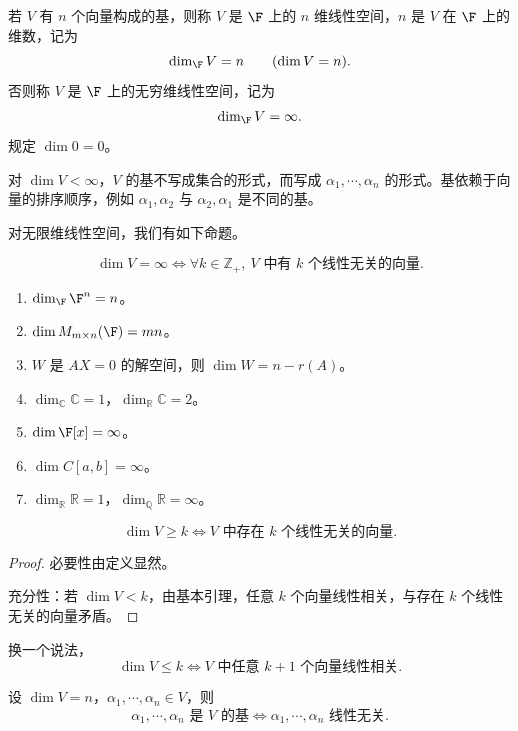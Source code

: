 \begin{definition}
	若 $V$ 有 $n$ 个向量构成的基，则称 $V$ 是 $\F$ 上的 $n$ 维线性空间，$n$ 是 $V$ 在 $\F$ 上的维数，记为
	\[
	\dim_{\F}V=n
	\qquad (\dim V=n).
	\]
	否则称 $V$ 是 $\F$ 上的无穷维线性空间，记为
	\[
	\dim_{\F}V=\infty.
	\]
	规定 $\dim 0=0$。
\end{definition}

对 $\dim V<\infty$，$V$ 的基不写成集合的形式，而写成 $\alpha_1,\cdots,\alpha_n$ 的形式。基依赖于向量的排序顺序，例如 $\alpha_1,\alpha_2$ 与 $\alpha_2,\alpha_1$ 是不同的基。

对无限维线性空间，我们有如下命题。
\begin{proposition}
	\[
	\dim V=\infty
	\Longleftrightarrow
	\forall k\in\mathbb{Z}_{+},\ V\text{ 中有 }k\text{ 个线性无关的向量}.
	\]
\end{proposition}

\begin{example}
	\begin{enumerate}
		\item $\dim_{\F}\F^n=n$。
		\item $\dim M_{m\times n}(\F)=mn$。
		\item $W$ 是 $AX=0$ 的解空间，则 $\dim W=n-r(A)$。
		\item $\dim_{\mathbb{C}}\mathbb{C}=1$，$\dim_{\mathbb{R}}\mathbb{C}=2$。
		\item $\dim \F[x]=\infty$。
		\item $\dim C[a,b]=\infty$。
		\item $\dim_{\mathbb{R}}\mathbb{R}=1$，$\dim_{\mathbb{Q}}\mathbb{R}=\infty$。
	\end{enumerate}
\end{example}

\begin{proposition}
	\[
	\dim V\geq k
	\Longleftrightarrow
	V\text{ 中存在 }k\text{ 个线性无关的向量}.
	\]
\end{proposition}

\begin{proof}
	必要性由定义显然。
	
	充分性：若 $\dim V<k$，由基本引理，任意 $k$ 个向量线性相关，与存在 $k$ 个线性无关的向量矛盾。
\end{proof}

换一个说法，
\[
\dim V\leq k
\Longleftrightarrow
V\text{ 中任意 }k+1\text{ 个向量线性相关}.
\]

\begin{corollary}
	设 $\dim V=n$，$\alpha_1,\cdots,\alpha_n\in V$，则
	\[
	\alpha_1,\cdots,\alpha_n\text{ 是 }V\text{ 的基}
	\Longleftrightarrow
	\alpha_1,\cdots,\alpha_n\text{ 线性无关}.
	\]
\end{corollary}

